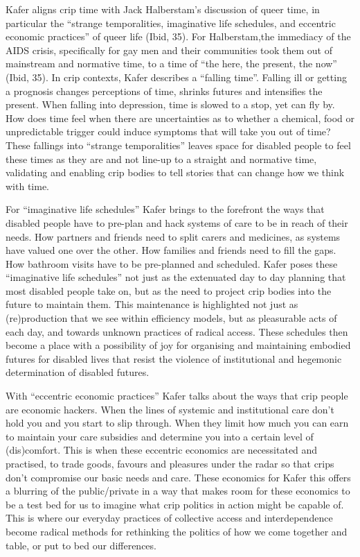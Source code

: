Kafer aligns crip time with Jack Halberstam's discussion of queer time,
in particular the ``strange temporalities, imaginative life schedules,
and eccentric economic practices'' of queer life (Ibid, 35). For
Halberstam,the immediacy of the AIDS crisis, specifically for gay men
and their communities took them out of mainstream and normative time, to
a time of ``the here, the present, the now'' (Ibid, 35). In crip
contexts, Kafer describes a ``falling time''. Falling ill or getting a
prognosis changes perceptions of time, shrinks futures and intensifies
the present. When falling into depression, time is slowed to a stop, yet
can fly by. How does time feel when there are uncertainties as to
whether a chemical, food or unpredictable trigger could induce symptoms
that will take you out of time? These fallings into ``strange
temporalities'' leaves space for disabled people to feel these times as
they are and not line-up to a straight and normative time, validating
and enabling crip bodies to tell stories that can change how we think
with time.

For ``imaginative life schedules'' Kafer brings to the forefront the
ways that disabled people have to pre-plan and hack systems of care to
be in reach of their needs. How partners and friends need to split
carers and medicines, as systems have valued one over the other. How
families and friends need to fill the gaps. How bathroom visits have to
be pre-planned and scheduled. Kafer poses these ``imaginative life
schedules'' not just as the extenuated day to day planning that most
disabled people take on, but as the need to project crip bodies into the
future to maintain them. This maintenance is highlighted not just as
(re)production that we see within efficiency models, but as pleasurable
acts of each day, and towards unknown practices of radical access. These
schedules then become a place with a possibility of joy for organising
and maintaining embodied futures for disabled lives that resist the
violence of institutional and hegemonic determination of disabled
futures.

With ``eccentric economic practices'' Kafer talks about the ways that
crip people are economic hackers. When the lines of systemic and
institutional care don't hold you and you start to slip through. When
they limit how much you can earn to maintain your care subsidies and
determine you into a certain level of (dis)comfort. This is when these
eccentric economics are necessitated and practised, to trade goods,
favours and pleasures under the radar so that crips don't compromise our
basic needs and care. These economics for Kafer this offers a blurring
of the public/private in a way that makes room for these economics to be
a test bed for us to imagine what crip politics in action might be
capable of. This is where our everyday practices of collective access
and interdependence become radical methods for rethinking the politics
of how we come together and table, or put to bed our differences.

